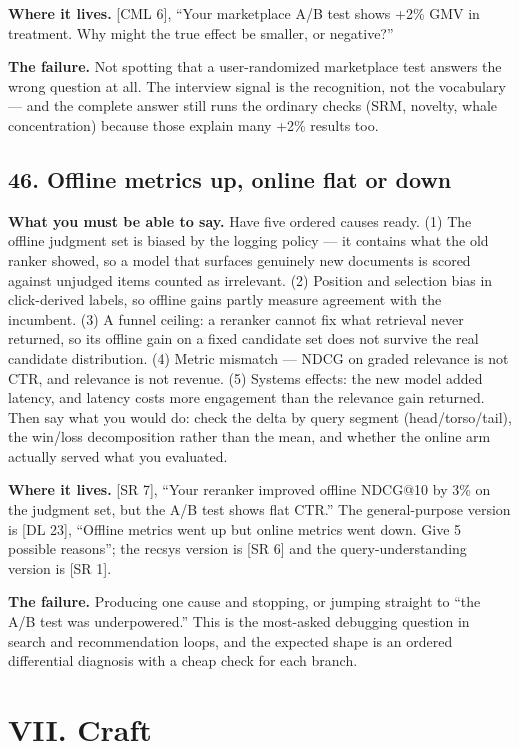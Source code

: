 \textbf{Where it lives.} [CML 6], ``Your marketplace A/B test shows +2\% GMV in treatment. Why might the true effect be smaller, or negative?''

\textbf{The failure.} Not spotting that a user-randomized marketplace test answers the wrong question at all. The interview signal is the recognition, not the vocabulary --- and the complete answer still runs the ordinary checks (SRM, novelty, whale concentration) because those explain many +2\% results too.

\subsection*{46. Offline metrics up, online flat or down}

\textbf{What you must be able to say.} Have five ordered causes ready. (1) The offline judgment set is biased by the logging policy --- it contains what the old ranker showed, so a model that surfaces genuinely new documents is scored against unjudged items counted as irrelevant. (2) Position and selection bias in click-derived labels, so offline gains partly measure agreement with the incumbent. (3) A funnel ceiling: a reranker cannot fix what retrieval never returned, so its offline gain on a fixed candidate set does not survive the real candidate distribution. (4) Metric mismatch --- NDCG on graded relevance is not CTR, and relevance is not revenue. (5) Systems effects: the new model added latency, and latency costs more engagement than the relevance gain returned. Then say what you would do: check the delta by query segment (head/torso/tail), the win/loss decomposition rather than the mean, and whether the online arm actually served what you evaluated.

\textbf{Where it lives.} [SR 7], ``Your reranker improved offline NDCG@10 by 3\% on the judgment set, but the A/B test shows flat CTR.'' The general-purpose version is [DL 23], ``Offline metrics went up but online metrics went down. Give 5 possible reasons''; the recsys version is [SR 6] and the query-understanding version is [SR 1].

\textbf{The failure.} Producing one cause and stopping, or jumping straight to ``the A/B test was underpowered.'' This is the most-asked debugging question in search and recommendation loops, and the expected shape is an ordered differential diagnosis with a cheap check for each branch.

\section*{VII. Craft}

